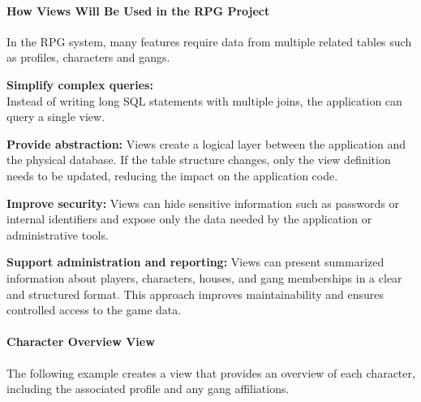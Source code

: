 \hypertarget{how-views-will-be-used-in-the-rpg-project}{%
\paragraph{How Views Will Be Used in the RPG
Project}\label{how-views-will-be-used-in-the-rpg-project}}

In the RPG system, many features require data from multiple related
tables such as profiles, characters and gangs.

\textbf{Simplify complex queries:}\\
Instead of writing long SQL statements with multiple joins, the
application can query a single view.

\textbf{Provide abstraction:} Views create a logical layer between the
application and the physical database. If the table structure changes,
only the view definition needs to be updated, reducing the impact on the
application code.

\textbf{Improve security:} Views can hide sensitive information such as
passwords or internal identifiers and expose only the data needed by the
application or administrative tools.

\textbf{Support administration and reporting:} Views can present
summarized information about players, characters, houses, and gang
memberships in a clear and structured format. This approach improves
maintainability and ensures controlled access to the game data.

\hypertarget{character-overview-view}{%
\paragraph{Character Overview View}\label{character-overview-view}}

The following example creates a view that provides an overview of each
character, including the associated profile and any gang affiliations.

